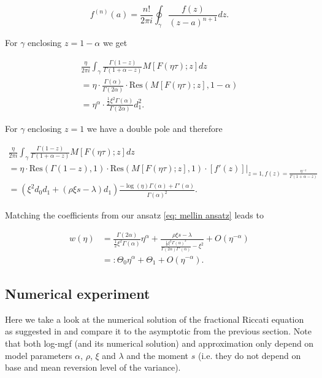 \documentclass[12pt]{article}
\theoremstyle{plain}
\begin{document}
$$
f^{(n)}(a)=\frac{n !}{2 \pi i} \oint_{\gamma} \frac{f(z)}{(z-a)^{n+1}} d z.
$$

For $\gamma$ enclosing $z=1-\alpha$ we get

$$
\begin{array}{l}
\frac{\eta}{2 \pi i} \int_\gamma \frac{\Gamma(1-z)}{\Gamma(1+\alpha-z)} M[F(\eta \tau) ; z] d z \\ [10pt]
= \eta \cdot \frac{\Gamma(\alpha)}{\Gamma(2\alpha)} \cdot \text{Res} (M[F(\eta\tau); z], 1-\alpha) \\ [10pt]
= \eta ^\alpha \cdot \frac{\frac 12 \xi^2 \Gamma(\alpha)}{\Gamma(2\alpha)}   d_1 ^2.
\end{array}
$$

For $\gamma$ enclosing $z=1$ we have a double pole and therefore

$$
\begin{array}{l}
\frac{\eta}{2 \pi i} \int_\gamma \frac{\Gamma(1-z)}{\Gamma(1+\alpha-z)} M[F(\eta \tau) ; z] d z \\ [10pt]
= \eta \cdot \text{Res}(\Gamma(1-z), 1) \cdot \text{Res}(M[F(\eta \tau); z], 1) \cdot \left. [f'(z)] \right| _{z = 1, f(z) = \frac{\eta^{-z}}{\Gamma(1+\alpha-z)}} \\ [10pt]
= (\xi^{2} d_{0} d_{1}+(\rho \xi s-\lambda) d_{1}) \frac{-\log (\eta) \Gamma(\alpha) + \Gamma'(\alpha)}{\Gamma(\alpha)^2}.
\end{array}
$$

Matching the coefficients from our ansatz \eqref{eq: mellin ansatz} leads to

$$
\begin{aligned}
w(\eta) &= \frac{\Gamma(2\alpha)}{\frac 12 \xi^2 \Gamma(\alpha)} \eta^\alpha + \frac{ \rho\xi s - \lambda}{ \frac{\frac12 \xi^ 2 \Gamma(\alpha)^3}{\Gamma(2\alpha) \Gamma'(\alpha)} - \xi^2} + O(\eta^{-\alpha})\\[10pt]
&=: \Theta_0 \eta^{\alpha} + \Theta_1 + O(\eta^{-\alpha}).
\end{aligned}
$$

\subsection{Numerical experiment}

Here we take a look at the numerical solution of the fractional Riccati equation as suggested in \cite{ER16} and compare it to the asymptotic from the previous section. Note that both log-mgf (and its numerical solution) and approximation only depend on model parameters $\alpha$, $\rho$, $\xi$ and $\lambda$ and the moment $s$ (i.e. they do not depend on base and mean reversion level of the variance).
\end{document}
